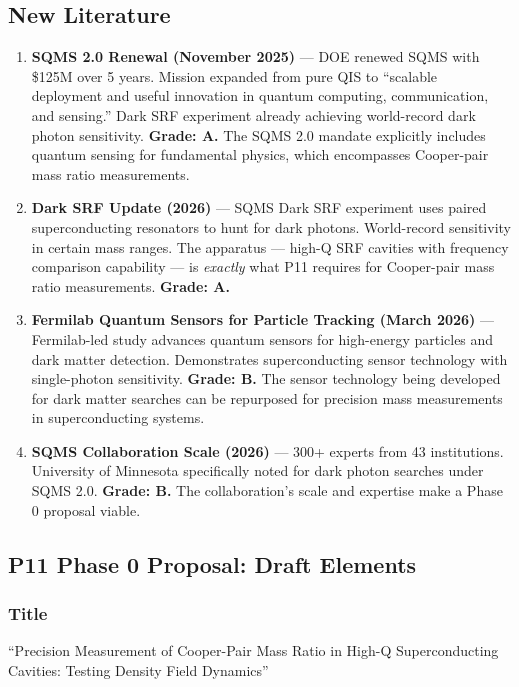 \documentclass[11pt,a4paper]{article}
\begin{document}
\subsection{New Literature}

\begin{enumerate}

\item \textbf{SQMS 2.0 Renewal (November 2025)} --- DOE renewed SQMS with \$125M over 5 years. Mission expanded from pure QIS to ``scalable deployment and useful innovation in quantum computing, communication, and sensing.'' Dark SRF experiment already achieving world-record dark photon sensitivity. \textbf{Grade: A.} The SQMS 2.0 mandate explicitly includes quantum sensing for fundamental physics, which encompasses Cooper-pair mass ratio measurements.

\item \textbf{Dark SRF Update (2026)} --- SQMS Dark SRF experiment uses paired superconducting resonators to hunt for dark photons. World-record sensitivity in certain mass ranges. The apparatus --- high-Q SRF cavities with frequency comparison capability --- is \emph{exactly} what P11 requires for Cooper-pair mass ratio measurements. \textbf{Grade: A.}

\item \textbf{Fermilab Quantum Sensors for Particle Tracking (March 2026)} --- Fermilab-led study advances quantum sensors for high-energy particles and dark matter detection. Demonstrates superconducting sensor technology with single-photon sensitivity. \textbf{Grade: B.} The sensor technology being developed for dark matter searches can be repurposed for precision mass measurements in superconducting systems.

\item \textbf{SQMS Collaboration Scale (2026)} --- 300+ experts from 43 institutions. University of Minnesota specifically noted for dark photon searches under SQMS 2.0. \textbf{Grade: B.} The collaboration's scale and expertise make a Phase 0 proposal viable.

\end{enumerate}

\subsection{P11 Phase 0 Proposal: Draft Elements}

\subsubsection{Title}
``Precision Measurement of Cooper-Pair Mass Ratio in High-Q Superconducting Cavities: Testing Density Field Dynamics''
\end{document}
